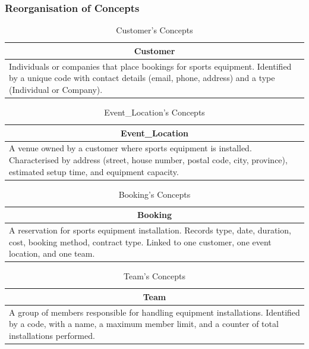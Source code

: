 \subsubsection{Reorganisation of Concepts}

\begin{table}[H]
    \renewcommand{\arraystretch}{1.3}
    \begin{tabularx}{\textwidth}{|X|}
    \hline \multicolumn{1}{|c|}{\textbf{Customer}} \\ \hline
    Individuals or companies that place bookings for sports equipment. Identified by a unique code with
    contact details (email, phone, address) and a type (Individual or Company). \\ \hline
    \end{tabularx}
    \caption{Customer's Concepts}
\end{table}

\begin{table}[H]
    \renewcommand{\arraystretch}{1.3}
    \begin{tabularx}{\textwidth}{|X|}
    \hline \multicolumn{1}{|c|}{\textbf{Event\_Location}} \\ \hline
    A venue owned by a customer where sports equipment is installed. Characterised by address
    (street, house number, postal code, city, province), estimated setup time, and equipment capacity. \\ \hline
    \end{tabularx}
    \caption{Event\_Location's Concepts}
\end{table}

\begin{table}[H]
    \renewcommand{\arraystretch}{1.3}
    \begin{tabularx}{\textwidth}{|X|}
    \hline \multicolumn{1}{|c|}{\textbf{Booking}} \\ \hline
    A reservation for sports equipment installation. Records type, date, duration, cost, booking method,
    contract type. Linked to one customer, one event location, and one team. \\ \hline
    \end{tabularx}
    \caption{Booking's Concepts}
\end{table}

\begin{table}[H]
    \renewcommand{\arraystretch}{1.3}
    \begin{tabularx}{\textwidth}{|X|}
    \hline \multicolumn{1}{|c|}{\textbf{Team}} \\ \hline
    A group of members responsible for handling equipment installations. Identified by a code, with a name,
    a maximum member limit, and a counter of total installations performed. \\ \hline
    \end{tabularx}
    \caption{Team's Concepts}
\end{table}

